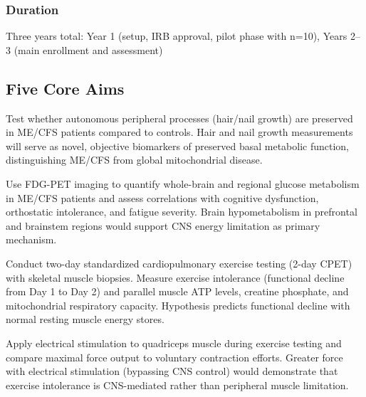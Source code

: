 \subsubsection{Duration}
Three years total: Year 1 (setup, IRB approval, pilot phase with n=10), Years 2--3 (main enrollment and assessment)

\subsection{Five Core Aims}

\begin{achievement}
\label{ach:sed-aim1}
Test whether autonomous peripheral processes (hair/nail growth) are preserved in ME/CFS patients compared to controls. Hair and nail growth measurements will serve as novel, objective biomarkers of preserved basal metabolic function, distinguishing ME/CFS from global mitochondrial disease.
\end{achievement}

\begin{achievement}
\label{ach:sed-aim2}
Use FDG-PET imaging to quantify whole-brain and regional glucose metabolism in ME/CFS patients and assess correlations with cognitive dysfunction, orthostatic intolerance, and fatigue severity. Brain hypometabolism in prefrontal and brainstem regions would support CNS energy limitation as primary mechanism.
\end{achievement}

\begin{achievement}
\label{ach:sed-aim3}
Conduct two-day standardized cardiopulmonary exercise testing (2-day CPET) with skeletal muscle biopsies. Measure exercise intolerance (functional decline from Day 1 to Day 2) and parallel muscle ATP levels, creatine phosphate, and mitochondrial respiratory capacity. Hypothesis predicts functional decline with normal resting muscle energy stores.
\end{achievement}

\begin{achievement}
\label{ach:sed-aim4}
Apply electrical stimulation to quadriceps muscle during exercise testing and compare maximal force output to voluntary contraction efforts. Greater force with electrical stimulation (bypassing CNS control) would demonstrate that exercise intolerance is CNS-mediated rather than peripheral muscle limitation.
\end{achievement}

